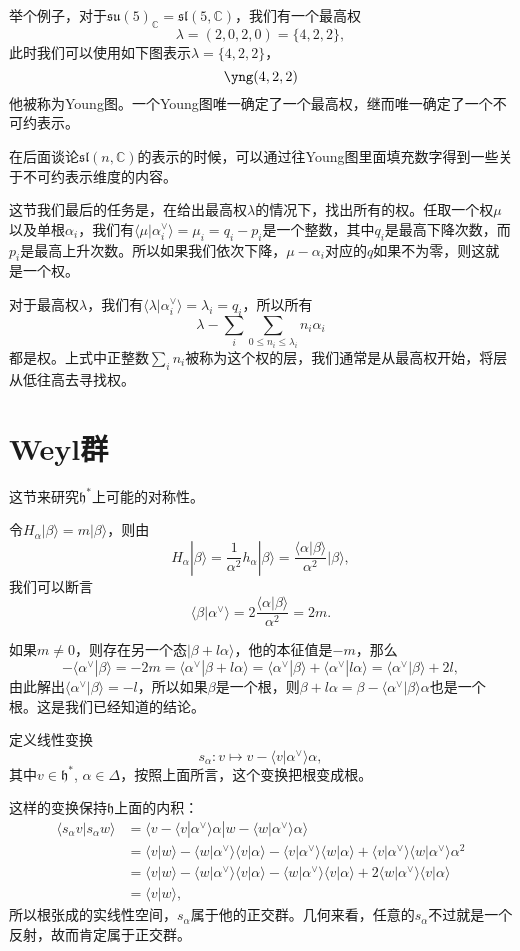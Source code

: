 \documentclass[9pt]{extarticle}
\newcommand{\cc}{\mathbb{C}}
\begin{document}
举个例子，对于$\mathfrak{su}(5)_\cc=\mathfrak{sl}(5,\cc)$，我们有一个最高权
\[
	\lambda=(2,0,2,0)=\{4,2,2\},
\]
此时我们可以使用如下图表示$\lambda=\{4,2,2\}$，
\[
	\yng(4,2,2)
\]
他被称为Young图。一个Young图唯一确定了一个最高权，继而唯一确定了一个不可约表示。

在后面谈论$\mathfrak{sl}(n,\cc)$的表示的时候，可以通过往Young图里面填充数字得到一些关于不可约表示维度的内容。

\para 这节我们最后的任务是，在给出最高权$\lambda$的情况下，找出所有的权。任取一个权$\mu$以及单根$\alpha_i$，我们有$\langle\mu|\alpha^\vee_i\rangle=\mu_i=q_i-p_i$是一个整数，其中$q_i$是最高下降次数，而$p_i$是最高上升次数。所以如果我们依次下降，$\mu-\alpha_i$对应的$q$如果不为零，则这就是一个权。

对于最高权$\lambda$，我们有$\langle\lambda|\alpha^\vee_i\rangle=\lambda_i=q_i$，所以所有
\[
	\lambda-\sum_i\sum_{0\leq n_i\leq \lambda_i}n_i\alpha_i
\]
都是权。上式中正整数$\sum_i n_i$被称为这个权的层，我们通常是从最高权开始，将层从低往高去寻找权。

\section{Weyl群}

这节来研究$\mathfrak{h}^*$上可能的对称性。

\para 令$H_\alpha|\beta\rangle = m|\beta\rangle$，则由
\[
	H_\alpha|\beta\rangle = \frac{1}{\alpha^2}h_\alpha|\beta\rangle=\frac{\langle\alpha|\beta\rangle}{\alpha^2}|\beta\rangle,
\]
我们可以断言
\[
	\langle\beta|\alpha^\vee\rangle=2\frac{\langle\alpha|\beta\rangle}{\alpha^2}=2m.
\]

如果$m\neq 0$，则存在另一个态$|\beta+l\alpha\rangle$，他的本征值是$-m$，那么
\[
	-\langle \alpha^\vee|\beta\rangle=-2m=\langle \alpha^\vee|\beta+l\alpha\rangle=\langle \alpha^\vee|\beta\rangle+\langle \alpha^\vee|l\alpha\rangle=\langle \alpha^\vee|\beta\rangle+2l,
\]
由此解出$\langle \alpha^\vee|\beta\rangle=-l$，所以如果$\beta$是一个根，则$\beta+l\alpha=\beta-\langle \alpha^\vee|\beta\rangle\alpha$也是一个根。这是我们已经知道的结论。

\para 定义线性变换
\[
	s_\alpha:v\mapsto v-\langle v|\alpha^\vee\rangle\alpha,
\]
其中$v\in \mathfrak{h}^*$, $\alpha\in\Delta$，按照上面所言，这个变换把根变成根。

这样的变换保持$\mathfrak{h}$上面的内积：
\begin{align*}
	\langle s_\alpha v|s_\alpha w\rangle &= \langle v-\langle v|\alpha^\vee\rangle\alpha|w-\langle w|\alpha^\vee\rangle\alpha\rangle\\ &=\langle v|w\rangle - \langle w|\alpha^\vee\rangle \langle v| \alpha\rangle - \langle v|\alpha^\vee\rangle \langle w| \alpha\rangle +\langle v|\alpha^\vee\rangle\langle w|\alpha^\vee\rangle \alpha^2\\
	&= \langle v|w\rangle - \langle w|\alpha^\vee\rangle \langle v| \alpha\rangle - \langle w|\alpha^\vee\rangle \langle v| \alpha\rangle +2\langle w|\alpha^\vee\rangle\langle v|\alpha\rangle\\
	&= \langle v|w\rangle,
\end{align*}
所以根张成的实线性空间，$s_\alpha$属于他的正交群。几何来看，任意的$s_\alpha$不过就是一个反射，故而肯定属于正交群。
\end{document}
